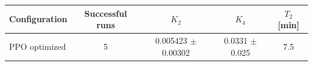 \begin{tabular}{lcccc}
\toprule
Configuration & Successful runs & $K_2$ & $K_4$ & $T_2$ [min] \\
\midrule
PPO optimized & 5 & 0.005423 $\pm$ 0.00302 & 0.0331 $\pm$ 0.025 & 7.5 \\
\bottomrule
\end{tabular}
